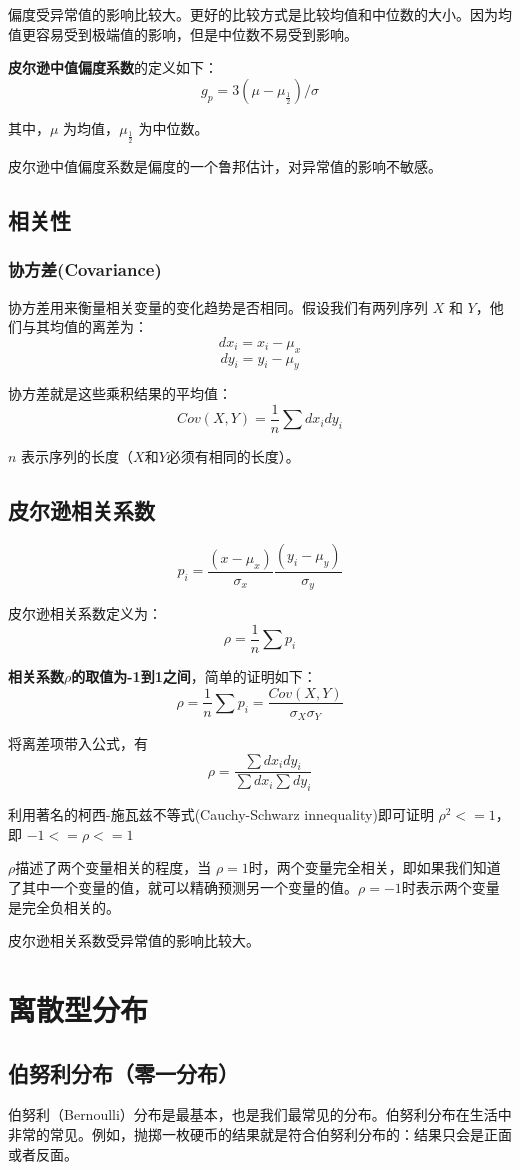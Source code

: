 \documentclass[12pt]{article}
\begin{document}
偏度受异常值的影响比较大。更好的比较方式是比较均值和中位数的大小。因为均值更容易受到极端值的影响，但是中位数不易受到影响。

\textbf{皮尔逊中值偏度系数}的定义如下：
$$
g_p = 3(\mu - \mu_{\frac{1}{2}})/\sigma
$$

其中，$\mu$ 为均值，$\mu_{\frac{1}{2}}$ 为中位数。

皮尔逊中值偏度系数是偏度的一个鲁邦估计，对异常值的影响不敏感。

\subsection{相关性}
\subsubsection{协方差(Covariance)\cite{Think_Stats}}
协方差用来衡量相关变量的变化趋势是否相同。假设我们有两列序列 $X$ 和 $Y$，他们与其均值的离差为：
$$
dx_i = x_i - \mu_x 
$$
$$
dy_i = y_i - \mu_y
$$

协方差就是这些乘积结果的平均值：
$$
Cov(X,Y) = \frac{1}{n}\sum{dx_idy_i}
$$

$n$ 表示序列的长度（$X$和$Y$必须有相同的长度）。

\subsection{皮尔逊相关系数}
$$
p_i = \frac{(x-\mu_x)}{\sigma_x}\frac{(y_i-\mu_y)}{\sigma_y}
$$

皮尔逊相关系数定义为：
$$
\rho = \frac{1}{n}\sum{p_i}
$$

\textbf{相关系数$\rho$的取值为-1到1之间}，简单的证明如下：
$$
\rho = \frac{1}{n}\sum{p_i} = \frac{Cov(X,Y)}{\sigma_X\sigma_Y}
$$

将离差项带入公式，有
$$
\rho = \frac{\sum dx_idy_i}{\sum{dx_i}\sum{dy_i}}
$$

利用著名的柯西-施瓦兹不等式(Cauchy-Schwarz innequality)即可证明 $\rho^2 <= 1$，即 $-1 <= \rho <= 1$

$\rho$描述了两个变量相关的程度，当 $\rho = 1$时，两个变量完全相关，即如果我们知道了其中一个变量的值，就可以精确预测另一个变量的值。$\rho = -1$时表示两个变量是完全负相关的。

皮尔逊相关系数受异常值的影响比较大。

\section{离散型分布}
\subsection{伯努利分布（零一分布）}
伯努利（Bernoulli）分布是最基本，也是我们最常见的分布。伯努利分布在生活中非常的常见。例如，抛掷一枚硬币的结果就是符合伯努利分布的：结果只会是正面或者反面。
\end{document}
